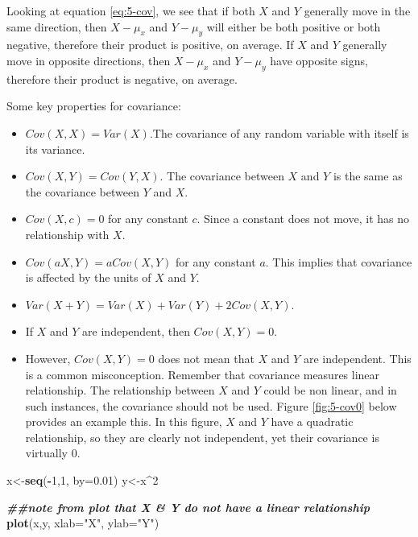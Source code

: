 \documentclass[
]{book}
\newenvironment{Shaded}{\begin{snugshade}}{\end{snugshade}}
\newcommand{\AttributeTok}[1]{\textcolor[rgb]{0.13,0.29,0.53}{#1}}
\newcommand{\DecValTok}[1]{\textcolor[rgb]{0.00,0.00,0.81}{#1}}
\newcommand{\DocumentationTok}[1]{\textcolor[rgb]{0.56,0.35,0.01}{\textbf{\textit{#1}}}}
\newcommand{\FloatTok}[1]{\textcolor[rgb]{0.00,0.00,0.81}{#1}}
\newcommand{\FunctionTok}[1]{\textcolor[rgb]{0.13,0.29,0.53}{\textbf{#1}}}
\newcommand{\NormalTok}[1]{#1}
\newcommand{\OtherTok}[1]{\textcolor[rgb]{0.56,0.35,0.01}{#1}}
\newcommand{\SpecialCharTok}[1]{\textcolor[rgb]{0.81,0.36,0.00}{\textbf{#1}}}
\newcommand{\StringTok}[1]{\textcolor[rgb]{0.31,0.60,0.02}{#1}}
\providecommand{\tightlist}{%
  \setlength{\itemsep}{0pt}\setlength{\parskip}{0pt}}
\begin{document}
Looking at equation \eqref{eq:5-cov}, we see that if both \(X\) and \(Y\) generally move in the same direction, then \(X - \mu_x\) and \(Y - \mu_y\) will either be both positive or both negative, therefore their product is positive, on average. If \(X\) and \(Y\) generally move in opposite directions, then \(X - \mu_x\) and \(Y - \mu_y\) have opposite signs, therefore their product is negative, on average.

Some key properties for covariance:

\begin{itemize}
\tightlist
\item
  \(Cov(X,X) = Var(X)\).The covariance of any random variable with itself is its variance.
\item
  \(Cov(X,Y) = Cov(Y,X)\). The covariance between \(X\) and \(Y\) is the same as the covariance between \(Y\) and \(X\).
\item
  \(Cov(X,c) = 0\) for any constant \(c\). Since a constant does not move, it has no relationship with \(X\).
\item
  \(Cov(aX,Y) = a Cov(X,Y)\) for any constant \(a\). This implies that covariance is affected by the units of \(X\) and \(Y\).
\item
  \(Var(X + Y) = Var(X) + Var(Y) + 2 Cov(X,Y)\).
\item
  If \(X\) and \(Y\) are independent, then \(Cov(X,Y) = 0\).
\item
  However, \(Cov(X,Y) = 0\) does not mean that \(X\) and \(Y\) are independent. This is a common misconception. Remember that covariance measures linear relationship. The relationship between \(X\) and \(Y\) could be non linear, and in such instances, the covariance should not be used. Figure \ref{fig:5-cov0} below provides an example this. In this figure, \(X\) and \(Y\) have a quadratic relationship, so they are clearly not independent, yet their covariance is virtually 0.
\end{itemize}

\begin{Shaded}
\begin{Highlighting}[]
\NormalTok{x}\OtherTok{\textless{}{-}}\FunctionTok{seq}\NormalTok{(}\SpecialCharTok{{-}}\DecValTok{1}\NormalTok{,}\DecValTok{1}\NormalTok{, }\AttributeTok{by=}\FloatTok{0.01}\NormalTok{)}
\NormalTok{y}\OtherTok{\textless{}{-}}\NormalTok{x}\SpecialCharTok{\^{}}\DecValTok{2}

\DocumentationTok{\#\#note from plot that X \& Y do not have a linear relationship}
\FunctionTok{plot}\NormalTok{(x,y, }\AttributeTok{xlab=}\StringTok{"X"}\NormalTok{, }\AttributeTok{ylab=}\StringTok{"Y"}\NormalTok{)}
\end{Highlighting}
\end{Shaded}
\end{document}
